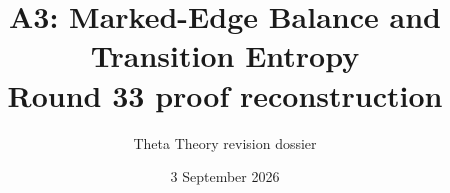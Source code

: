 \documentclass[11pt]{article}
\title{A3: Marked-Edge Balance and Transition Entropy\\\large Round 33 proof reconstruction}
\author{Theta Theory revision dossier}
\date{3 September 2026}
\begin{document}
\maketitle
\reviewnote

\end{document}
